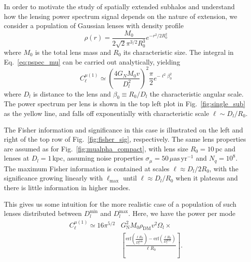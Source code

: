 \documentclass[twocolumn]{aastex63}
\begin{document}
In order to motivate the study of spatially extended subhalos and understand how the lensing power spectrum signal depends on the nature of extension, we consider a population of Gaussian lenses with density profile 
\begin{equation}
\rho(r) =\frac{M_0}{2\sqrt{2}\pi^{3/2}R_0^3} e^{-r^2/2R_0^2} 
\label{eq:Gaussianrho}
\end{equation} 
where $M_0$ is the total lens mass and $R_0$ its characteristic size. The integral in Eq.~\ref{eq:pspec_mu} can be carried out analytically, yielding
\begin{equation}
C_{\ell}^{\mu (1)} \simeq \left(\frac{4 G_N M_0 v}{D_l^2}\right)^2 \frac{\pi}{2} e^{-\ell^2\beta_0^2}
 \label{eq:mu_ext}
\end{equation}
where $D_l$ is distance to the lens and $\beta_0 \equiv R_0/D_l$ the characteristic angular scale. The power spectrum per lens is shown in the top left plot in Fig.~\ref{fig:single_sub} as the yellow line, and falls off exponentially with characteristic scale $\ell \sim D_l/R_0$.

The Fisher information and significance in this case is illustrated on the left and right of the top row of Fig.~\ref{fig:fisher_sig}, respectively. The same lens properties are assumed as for Fig.~\ref{fig:mualpha_compact}, with lens size $R_0=10$\,pc and lenses at $D_l=1$\,kpc, assuming noise properties $\sigma_\mu = 50\,\mu\mathrm{as}\,\mathrm{yr}^{-1}$ and $N_q = 10^8$. The maximum Fisher information is contained at scales $\ell \approx {D_l}/{2R_0}$, with the significance growing linearly with $\ell_\mathrm{max}$ until $\ell \approx {D_l}/{R_0}$ when it plateaus and there is little information in higher modes. 

This gives us some intuition for the more realistic case of a population of such lenses distributed between $D_l^{\mathrm{min}}$ and $D_l^{\mathrm{max}}$. Here, we have the power per mode 
\begin{align}
C_{\ell}^{\mu (1)} \simeq 16 \pi ^{5/2} &G_\mathrm{N}^2 M_0 \rho_\mathrm{DM} v^2 \Omega_l\times\nonumber\\ &\left[\frac{{\mathrm{erf}}\left(\frac{\ell
   {R_0}}{D_l^{\mathrm{min}}}\right)-{\mathrm{erf}}\left(\frac{\ell {R_0}}{{D_l^{\mathrm{max}}}}\right)}{\ell {R_0}}\right].
 \label{eq:mu_extpop}
\end{align}
\end{document}
